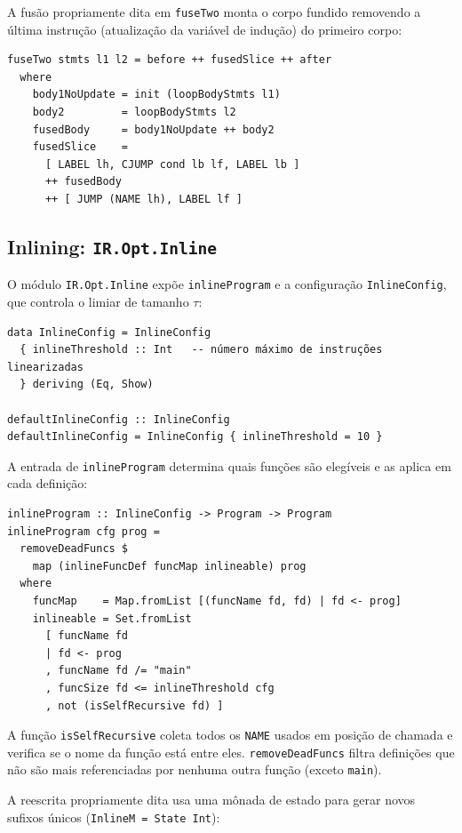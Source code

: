 A fusão propriamente dita em \texttt{fuseTwo} monta o corpo fundido removendo a
última instrução (atualização da variável de indução) do primeiro corpo:

\begin{verbatim}
fuseTwo stmts l1 l2 = before ++ fusedSlice ++ after
  where
    body1NoUpdate = init (loopBodyStmts l1)
    body2         = loopBodyStmts l2
    fusedBody     = body1NoUpdate ++ body2
    fusedSlice    =
      [ LABEL lh, CJUMP cond lb lf, LABEL lb ]
      ++ fusedBody
      ++ [ JUMP (NAME lh), LABEL lf ]
\end{verbatim}

\subsection{Inlining: \texttt{IR.Opt.Inline}}\label{sec:impl-inline}

O módulo \texttt{IR.Opt.Inline} expõe \texttt{inlineProgram} e a configuração
\texttt{InlineConfig}, que controla o limiar de tamanho $\tau$:

\begin{verbatim}
data InlineConfig = InlineConfig
  { inlineThreshold :: Int   -- número máximo de instruções linearizadas
  } deriving (Eq, Show)

defaultInlineConfig :: InlineConfig
defaultInlineConfig = InlineConfig { inlineThreshold = 10 }
\end{verbatim}

A entrada de \texttt{inlineProgram} determina quais funções são elegíveis e as
aplica em cada definição:

\begin{verbatim}
inlineProgram :: InlineConfig -> Program -> Program
inlineProgram cfg prog =
  removeDeadFuncs $
    map (inlineFuncDef funcMap inlineable) prog
  where
    funcMap    = Map.fromList [(funcName fd, fd) | fd <- prog]
    inlineable = Set.fromList
      [ funcName fd
      | fd <- prog
      , funcName fd /= "main"
      , funcSize fd <= inlineThreshold cfg
      , not (isSelfRecursive fd) ]
\end{verbatim}

A função \texttt{isSelfRecursive} coleta todos os \texttt{NAME} usados em
posição de chamada e verifica se o nome da função está entre eles.
\texttt{removeDeadFuncs} filtra definições que não são mais referenciadas por
nenhuma outra função (exceto \texttt{main}).

A reescrita propriamente dita usa uma mônada de estado para gerar
novos sufixos únicos (\texttt{InlineM = State Int}):

